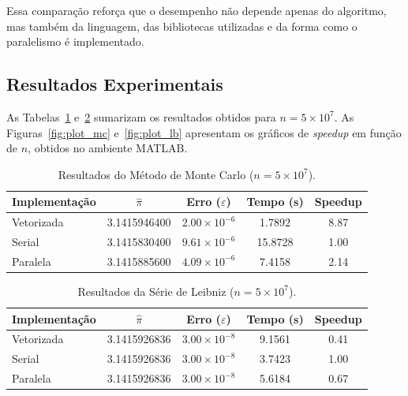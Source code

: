 \documentclass[12pt, a4paper]{article}
\begin{document}
	Essa comparação reforça que o desempenho não depende apenas do algoritmo,
	mas também da linguagem, das bibliotecas utilizadas e da forma como o
	paralelismo é implementado.
	
	\subsection{Resultados Experimentais}
	
	As Tabelas~\ref{tab:resultados_mc} e~\ref{tab:resultados_lb} sumarizam os
	resultados obtidos para $n = 5 \times 10^7$. As Figuras~\ref{fig:plot_mc}
	e~\ref{fig:plot_lb} apresentam os gráficos de \textit{speedup} em função de $n$,
	obtidos no ambiente MATLAB.
	
	\begin{table}[H]
		\centering
		\caption{Resultados do Método de Monte Carlo ($n = 5\times10^7$).}
		\label{tab:resultados_mc}
		\begin{tabular}{lcccc}
			\toprule
			\textbf{Implementação} &
			\textbf{$\hat{\pi}$} &
			\textbf{Erro ($\varepsilon$)} &
			\textbf{Tempo (s)} &
			\textbf{Speedup} \\
			\midrule
			Vetorizada  & 3.1415946400 & $2.00\times10^{-6}$ & 1.7892 & 8.87 \\
			Serial      & 3.1415830400 & $9.61\times10^{-6}$ & 15.8728 & 1.00 \\
			Paralela    & 3.1415885600 & $4.09\times10^{-6}$ & 7.4158 & 2.14 \\
			\bottomrule
		\end{tabular}
	\end{table}
	
	\begin{table}[H]
		\centering
		\caption{Resultados da Série de Leibniz ($n = 5\times10^7$).}
		\label{tab:resultados_lb}
		\begin{tabular}{lcccc}
			\toprule
			\textbf{Implementação} &
			\textbf{$\hat{\pi}$} &
			\textbf{Erro ($\varepsilon$)} &
			\textbf{Tempo (s)} &
			\textbf{Speedup} \\
			\midrule
			Vetorizada  & 3.1415926836 & $3.00\times10^{-8}$ & 9.1561 & 0.41 \\
			Serial      & 3.1415926836 & $3.00\times10^{-8}$ & 3.7423 & 1.00 \\
			Paralela    & 3.1415926836 & $3.00\times10^{-8}$ & 5.6184 & 0.67 \\
			\bottomrule
		\end{tabular}
	\end{table}
	
\end{document}

